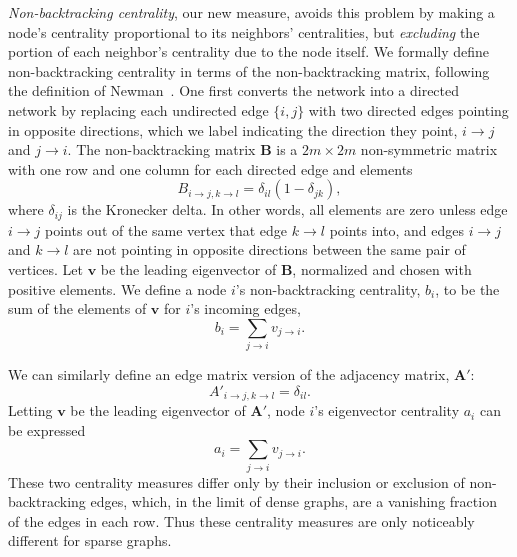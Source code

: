 \documentclass[twocolumn,prl,superscriptaddress]{revtex4}
\newcommand{\mat}{\mathbf}
\renewcommand{\vec}{\mathbf}
\begin{document}
\emph{Non-backtracking centrality}, our new measure, avoids this problem by making a node's centrality proportional to its neighbors' centralities, but \emph{excluding} the portion of each neighbor's centrality due to the node itself. We formally define non-backtracking centrality in terms of the non-backtracking matrix, following the definition of Newman~\cite{newman13}. One first converts the network into a directed network by replacing each undirected edge $\{i, j\}$ with two directed edges pointing in opposite directions, which we label indicating the direction they point, $i \rightarrow j$ and $j \rightarrow i$. The non-backtracking matrix $\mat{B}$ is a $2m \times 2m$ non-symmetric matrix with one row and one column for each directed edge and elements
\begin{equation}
B_{i\rightarrow j, k \rightarrow l} = \delta_{il}(1-\delta_{jk}),
\end{equation}
where $\delta_{ij}$ is the Kronecker delta. In other words, all elements are zero unless edge $i\rightarrow j$ points out of the same vertex that edge $k \rightarrow l$ points into, and edges $i \rightarrow j$ and $k \rightarrow l$ are not pointing in opposite directions between the same pair of vertices. Let $\vec{v}$ be the leading eigenvector of $\mat{B}$, normalized and chosen with positive elements. We define a node $i$'s non-backtracking centrality, $b_i$, to be the sum of the elements of $\vec{v}$ for $i$'s incoming edges,
\begin{equation*}
b_i = \sum_{j\rightarrow i} v_{j\rightarrow i}.
\end{equation*}

We can similarly define an edge matrix version of the adjacency matrix, $\mat{A'}$:
\begin{equation*}
A'_{i\rightarrow j, k \rightarrow l} = \delta_{il}.
\end{equation*}
Letting $\vec{v}$ be the leading eigenvector of $\mat{A'}$, node $i$'s eigenvector centrality $a_i$ can be expressed
\begin{equation}
a_i = \sum_{j\rightarrow i} v_{j\rightarrow i}.
\end{equation}
These two centrality measures differ only by their inclusion or exclusion of non-backtracking edges, which, in the limit of dense graphs, are a vanishing fraction of the edges in each row. Thus these centrality measures are only noticeably different for sparse graphs.
\end{document}
